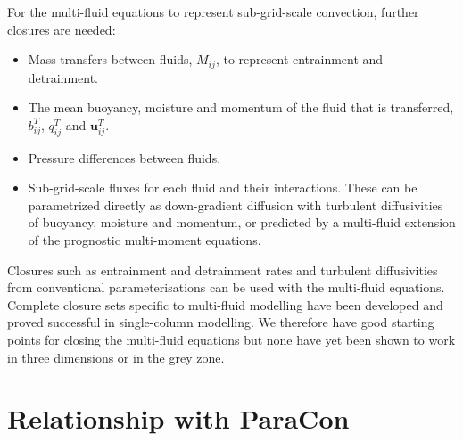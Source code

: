 \documentclass[11pt,a4paper]{article}
\begin{document}
For the multi-fluid equations to represent sub-grid-scale convection, further closures are needed:\hspace{-1in}
\begin{itemize}
\item Mass transfers between fluids, $M_{ij}$, to represent entrainment and detrainment.
\item The mean buoyancy, moisture and momentum of the fluid that is transferred, $b_{ij}^T$, $q_{ij}^T$ and $\mathbf{u}_{ij}^T$. 
\item Pressure differences between fluids.
\item Sub-grid-scale fluxes for each fluid and their interactions. These can be parametrized directly as down-gradient diffusion with turbulent diffusivities of buoyancy, moisture and momentum, or predicted by a multi-fluid extension of the prognostic multi-moment equations.

\end{itemize}
Closures such as entrainment and detrainment rates and turbulent diffusivities from conventional parameterisations can be used with the multi-fluid equations. Complete closure sets specific to multi-fluid modelling have been developed \cite[]{WMS20,TEB19} and proved successful in single-column modelling. We therefore have good starting points for closing the multi-fluid equations but none have yet been shown to work in three dimensions or in the grey zone. 

\section{Relationship with ParaCon}
\end{document}
